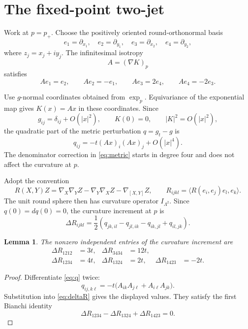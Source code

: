 \documentclass[10pt,reqno]{amsart}
\newtheorem{lemma}[theorem]{Lemma}
\theoremstyle{definition}
\begin{document}
\section{The fixed-point two-jet}

Work at \(p=p_+\).  Choose the positively oriented round-orthonormal basis
\[
 e_1=\partial_{x_1},\quad e_2=\partial_{y_1},\quad
 e_3=\partial_{x_2},\quad e_4=\partial_{y_2},
\]
where \(z_j=x_j+iy_j\).  The infinitesimal isotropy
\[
 A=(\nabla K)_p
\]
satisfies
\[
 Ae_1=e_2,\qquad Ae_2=-e_1,\qquad
 Ae_3=2e_4,\qquad Ae_4=-2e_3.
\]

Use \(g\)-normal coordinates obtained from \(\exp_p\).  Equivariance of the
exponential map gives \(K(x)=Ax\) in these coordinates.  Since
\[
 g_{ij}=\delta_{ij}+O(\lvert x\rvert^2),\qquad
 K(0)=0,\qquad \lvert K\rvert^2=O(\lvert x\rvert^2),
\]
the quadratic part of the metric perturbation
\(q=g_t-g\) is
\begin{equation}\label{eq:q}
 q_{ij}=-t(Ax)_i(Ax)_j+O(\lvert x\rvert^4).
\end{equation}
The denominator correction in \eqref{eq:metric} starts in degree four and
does not affect the curvature at \(p\).

Adopt the convention
\[
 R(X,Y)Z=\nabla_X\nabla_YZ-\nabla_Y\nabla_XZ-\nabla_{[X,Y]}Z,
\qquad
 R_{ijkl}=\langle R(e_i,e_j)e_l,e_k\rangle.
\]
The unit round sphere then has curvature operator
\(I_{\Lambda^2}\).  Since \(q(0)=dq(0)=0\), the curvature increment at \(p\)
is
\begin{equation}\label{eq:deltaR}
 \Delta R_{ijkl}
 =\frac12\left(
 q_{jk,il}-q_{jl,ik}-q_{ik,jl}+q_{il,jk}
 \right).
\end{equation}

\begin{lemma}\label{lem:entries}
The nonzero independent entries of the curvature increment are
\[
\begin{aligned}
\Delta R_{1212}&=3t,&
\Delta R_{3434}&=12t,\\
\Delta R_{1234}&=4t,&
\Delta R_{1324}&=2t,&
\Delta R_{1423}&=-2t.
\end{aligned}
\]
\end{lemma}

\begin{proof}
Differentiate \eqref{eq:q} twice:
\[
 q_{ij,k\ell}
 =-t\bigl(A_{ik}A_{j\ell}+A_{i\ell}A_{jk}\bigr).
\]
Substitution into \eqref{eq:deltaR} gives the displayed values.  They satisfy
the first Bianchi identity
\[
 \Delta R_{1234}-\Delta R_{1324}+\Delta R_{1423}=0.
\]
\end{proof}
\end{document}
